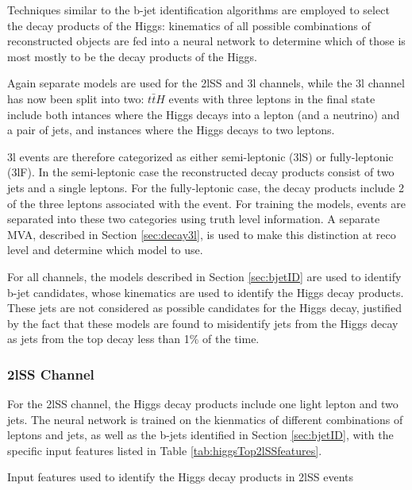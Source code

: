 Techniques similar to the b-jet identification algorithms are employed to select the decay products of the Higgs: kinematics of all possible combinations of reconstructed objects are fed into a neural network to determine which of those is most mostly to be the decay products of the Higgs.

Again separate models are used for the 2lSS and 3l channels, while the 3l channel has now been split into two: $t\bar{t}H$ events with three leptons in the final state include both intances where the Higgs decays into a lepton (and a neutrino) and a pair of jets, and instances where the Higgs decays to two leptons.

3l events are therefore categorized as either semi-leptonic (3lS) or fully-leptonic (3lF). In the semi-leptonic case the reconstructed decay products consist of two jets and a single leptons. For the fully-leptonic case, the decay products include 2 of the three leptons associated with the event. For training the models, events are separated into these two categories using truth level information. A separate MVA, described in Section \ref{sec:decay3l}, is used to make this distinction at reco level and determine which model to use.

For all channels, the models described in Section \ref{sec:bjetID} are used to identify b-jet candidates, whose kinematics are used to identify the Higgs decay products. These jets are not considered as possible candidates for the Higgs decay, justified by the fact that these models are found to misidentify jets from the Higgs decay as jets from the top decay less than 1\% of the time.

\subsubsection{2lSS Channel}
\label{subsec:higgs2lSS}

For the 2lSS channel, the Higgs decay products include one light lepton and two jets. The neural network is trained on the kienmatics of different combinations of leptons and jets, as well as the b-jets identified in Section \ref{sec:bjetID}, with the specific input features listed in Table \ref{tab:higgsTop2lSSfeatures}.

\begin{table}[H]

\caption{Input features used to identify the Higgs decay products in 2lSS events}
\label{tab:higgsTop2lSSfeatures}
\end{table}

